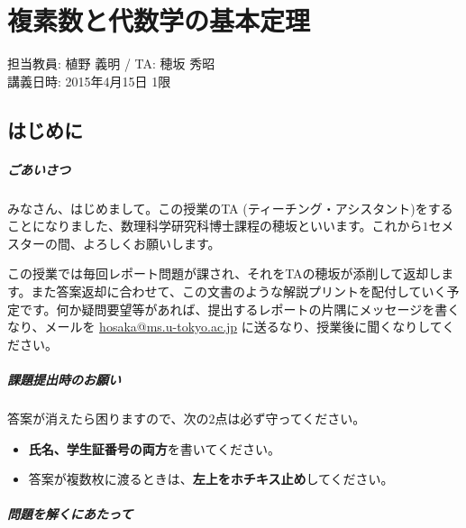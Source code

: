 \chapter{複素数と代数学の基本定理}

\begin{flushright}
担当教員: 植野 義明 / TA: 穂坂 秀昭 \\
講義日時: 2015年4月15日 1限
\end{flushright}

\section{はじめに}

\paragraph{ごあいさつ}

みなさん、はじめまして。この授業のTA (ティーチング・アシスタント)をすることになりました、数理科学研究科博士課程の穂坂といいます。これから$1$セメスターの間、よろしくお願いします。

この授業では毎回レポート問題が課され、それをTAの穂坂が添削して返却します。また答案返却に合わせて、この文書のような解説プリントを配付していく予定です。何か疑問要望等があれば、提出するレポートの片隅にメッセージを書くなり、メールを \url{hosaka@ms.u-tokyo.ac.jp} に送るなり、授業後に聞くなりしてください。

\paragraph{課題提出時のお願い}
答案が消えたら困りますので、次の$2$点は必ず守ってください。\vspace{-0.5zw}
\begin{itemize}
\item \textbf{氏名、学生証番号の両方}を書いてください。
\item 答案が複数枚に渡るときは、\textbf{左上をホチキス止め}してください。
\end{itemize}

\vspace{-1zw}

\paragraph{問題を解くにあたって}

